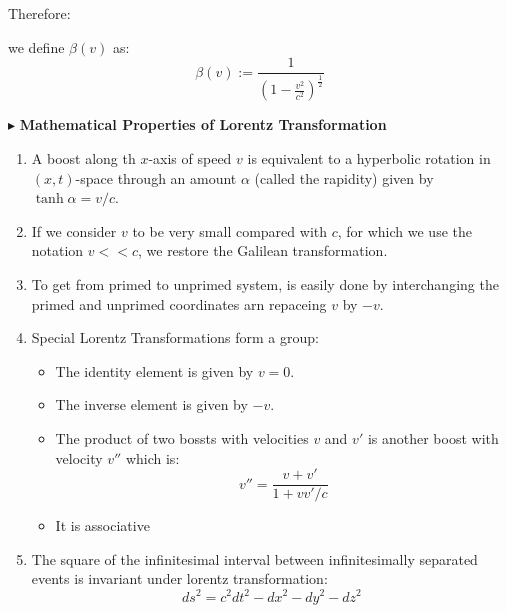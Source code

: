 \documentclass[10pt,a4paper,twocolumn]{article}
\newcounter{def}
\newcommand{\newpoint}[1]{\indent$\blacktriangleright$ \textbf{#1}}
\begin{document}
                Therefore:
                \begin{definition}
                    we define $\beta(v)$ as:
                    \begin{equation}
                        \beta(v) := \frac{1}{(1-\frac{v^2}{c^2})^{\frac12}}
                    \end{equation}
                \end{definition}
                \newpage
                \newpoint{Mathematical Properties of Lorentz Transformation}
                \begin{enumerate}
                    \item A boost along th $x$-axis of speed $v$ is equivalent to a hyperbolic rotation in $(x,t)$-space through an amount $\alpha$ (called the rapidity) given by $\tanh\alpha = v/c$.
                    \item If we consider $v$ to be very small compared with $c$, for which we use the notation $v<<c$, we restore the Galilean transformation.
                    \item To get from primed to unprimed system, is easily done by interchanging the primed and unprimed coordinates arn repaceing $v$ by $-v$.
                    \item Special Lorentz Transformations form a group:
                    \begin{itemize}
                        \item The identity element is given by $v=0$.
                        \item The inverse element is given by $-v$.
                        \item The product of two bossts with velocities $v$ and $v'$ is another boost with velocity $v''$ which is:
                        \begin{equation}
                            v'' = \frac{v + v'}{1+vv'/c}
                        \end{equation}
                        \item It is associative
                    \end{itemize}
                    \item The square of the infinitesimal interval between infinitesimally separated events is invariant under lorentz transformation:
                    \begin{equation}
                        ds^2 = c^2dt^2 - dx^2 - dy^2 - dz^2
                    \end{equation}
                \end{enumerate}
\end{document}
